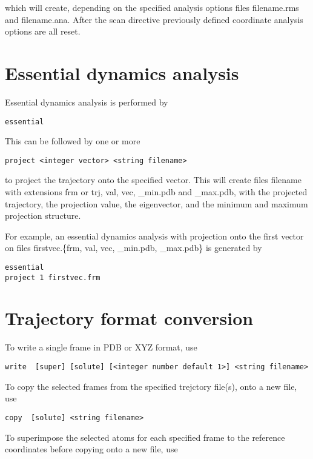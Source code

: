 which will create, depending on the specified analysis options
files filename.rms and filename.ana. After the scan directive
previously defined coordinate analysis options are all reset.

\section{Essential dynamics analysis}

Essential dynamics analysis is performed by

\begin{verbatim}
essential
\end{verbatim}

This can be followed by one or more

\begin{verbatim}
project <integer vector> <string filename>
\end{verbatim}

to project the trajectory onto the specified vector. This will
create files filename with extensions frm or trj, val, vec, \_min.pdb
and \_max.pdb, with the projected trajectory, the projection
value, the eigenvector, and the minimum and maximum projection
structure.

For example, an essential dynamics analysis with projection onto
the first vector on files firstvec.\{frm, val, vec, \_min.pdb, \_max.pdb\}
is generated by

\begin{verbatim}
essential
project 1 firstvec.frm
\end{verbatim}

\section{Trajectory format conversion}

To write a single frame in PDB or XYZ format, use

\begin{verbatim}
write  [super] [solute] [<integer number default 1>] <string filename>
\end{verbatim}

To copy the selected frames from the specified trejctory file(s),
onto a new file, use

\begin{verbatim}
copy  [solute] <string filename>
\end{verbatim}

To superimpose the selected atoms for each specified frame to the 
reference coordinates before copying onto a new file, use


